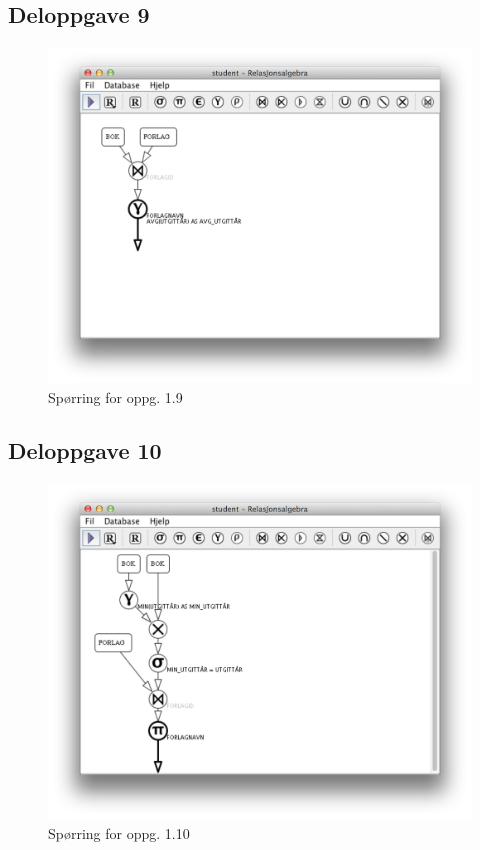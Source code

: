 \documentclass[a4paper, 12pt] {article}
\begin{document}
\subsection{Deloppgave 9}
\begin{figure}[h!]
    \includegraphics[width=\linewidth]{img/1-9.png}
    \caption{Spørring for oppg. 1.9 \label{img:1.9}}
\end{figure}
\newpage

\subsection{Deloppgave 10}
\begin{figure}[h!]
    \includegraphics[width=\linewidth]{img/1-10.png}
    \caption{Spørring for oppg. 1.10 \label{img:1.10}}
\end{figure}
\newpage
\end{document}
